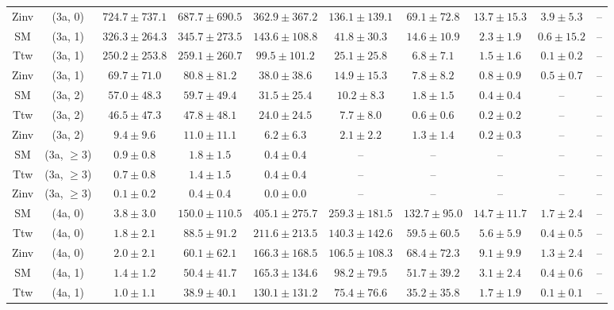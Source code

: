\begin{table}[h!]
{\begin{tabular}{cccccccccc}
	Zinv & (3a, 0) & $724.7\pm 737.1$ & $687.7\pm 690.5$ & $362.9\pm 367.2$ & $136.1\pm 139.1$ & $69.1\pm 72.8$ & $13.7\pm 15.3$ & $3.9\pm 5.3$ & -- \\[0.5ex] 
	SM & (3a, 1) & $326.3\pm 264.3$ & $345.7\pm 273.5$ & $143.6\pm 108.8$ & $41.8\pm 30.3$ & $14.6\pm 10.9$ & $2.3\pm 1.9$ & $0.6\pm 15.2$ & -- \\[0.5ex] 
	Ttw & (3a, 1) & $250.2\pm 253.8$ & $259.1\pm 260.7$ & $99.5\pm 101.2$ & $25.1\pm 25.8$ & $6.8\pm 7.1$ & $1.5\pm 1.6$ & $0.1\pm 0.2$ & -- \\[0.5ex] 
	Zinv & (3a, 1) & $69.7\pm 71.0$ & $80.8\pm 81.2$ & $38.0\pm 38.6$ & $14.9\pm 15.3$ & $7.8\pm 8.2$ & $0.8\pm 0.9$ & $0.5\pm 0.7$ & -- \\[0.5ex] 
	SM & (3a, 2) & $57.0\pm 48.3$ & $59.7\pm 49.4$ & $31.5\pm 25.4$ & $10.2\pm 8.3$ & $1.8\pm 1.5$ & $0.4\pm 0.4$ & -- & -- \\[0.5ex] 
	Ttw & (3a, 2) & $46.5\pm 47.3$ & $47.8\pm 48.1$ & $24.0\pm 24.5$ & $7.7\pm 8.0$ & $0.6\pm 0.6$ & $0.2\pm 0.2$ & -- & -- \\[0.5ex] 
	Zinv & (3a, 2) & $9.4\pm 9.6$ & $11.0\pm 11.1$ & $6.2\pm 6.3$ & $2.1\pm 2.2$ & $1.3\pm 1.4$ & $0.2\pm 0.3$ & -- & -- \\[0.5ex] 
	SM & (3a, $\ge3$) & $0.9\pm 0.8$ & $1.8\pm 1.5$ & $0.4\pm 0.4$ & -- & -- & -- & -- & -- \\[0.5ex] 
	Ttw & (3a, $\ge3$) & $0.7\pm 0.8$ & $1.4\pm 1.5$ & $0.4\pm 0.4$ & -- & -- & -- & -- & -- \\[0.5ex] 
	Zinv & (3a, $\ge3$) & $0.1\pm 0.2$ & $0.4\pm 0.4$ & $0.0\pm 0.0$ & -- & -- & -- & -- & -- \\[0.5ex] 
	SM & (4a, 0) & $3.8\pm 3.0$ & $150.0\pm 110.5$ & $405.1\pm 275.7$ & $259.3\pm 181.5$ & $132.7\pm 95.0$ & $14.7\pm 11.7$ & $1.7\pm 2.4$ & -- \\[0.5ex] 
	Ttw & (4a, 0) & $1.8\pm 2.1$ & $88.5\pm 91.2$ & $211.6\pm 213.5$ & $140.3\pm 142.6$ & $59.5\pm 60.5$ & $5.6\pm 5.9$ & $0.4\pm 0.5$ & -- \\[0.5ex] 
	Zinv & (4a, 0) & $2.0\pm 2.1$ & $60.1\pm 62.1$ & $166.3\pm 168.5$ & $106.5\pm 108.3$ & $68.4\pm 72.3$ & $9.1\pm 9.9$ & $1.3\pm 2.4$ & -- \\[0.5ex] 
	SM & (4a, 1) & $1.4\pm 1.2$ & $50.4\pm 41.7$ & $165.3\pm 134.6$ & $98.2\pm 79.5$ & $51.7\pm 39.2$ & $3.1\pm 2.4$ & $0.4\pm 0.6$ & -- \\[0.5ex] 
	Ttw & (4a, 1) & $1.0\pm 1.1$ & $38.9\pm 40.1$ & $130.1\pm 131.2$ & $75.4\pm 76.6$ & $35.2\pm 35.8$ & $1.7\pm 1.9$ & $0.1\pm 0.1$ & -- \\[0.5ex] 

\end{tabular}}
\end{table}
